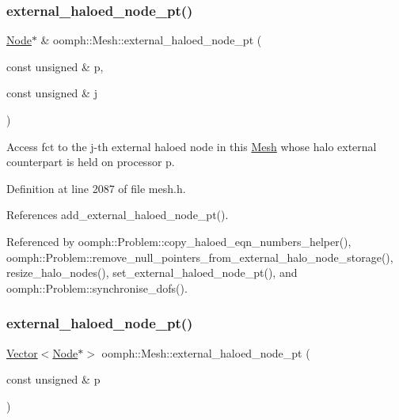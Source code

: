 \subsubsection{\texorpdfstring{external\+\_\+haloed\+\_\+node\+\_\+pt()}{external\_haloed\_node\_pt()}\hspace{0.1cm}{\footnotesize\ttfamily [1/2]}}
{\footnotesize\ttfamily \hyperlink{classoomph_1_1Node}{Node}$\ast$ \& oomph\+::\+Mesh\+::external\+\_\+haloed\+\_\+node\+\_\+pt (\begin{DoxyParamCaption}\item[{const unsigned \&}]{p,  }\item[{const unsigned \&}]{j }\end{DoxyParamCaption})\hspace{0.3cm}{\ttfamily [inline]}}



Access fct to the j-\/th external haloed node in this \hyperlink{classoomph_1_1Mesh}{Mesh} whose halo external counterpart is held on processor p. 



Definition at line 2087 of file mesh.\+h.



References add\+\_\+external\+\_\+haloed\+\_\+node\+\_\+pt().



Referenced by oomph\+::\+Problem\+::copy\+\_\+haloed\+\_\+eqn\+\_\+numbers\+\_\+helper(), oomph\+::\+Problem\+::remove\+\_\+null\+\_\+pointers\+\_\+from\+\_\+external\+\_\+halo\+\_\+node\+\_\+storage(), resize\+\_\+halo\+\_\+nodes(), set\+\_\+external\+\_\+haloed\+\_\+node\+\_\+pt(), and oomph\+::\+Problem\+::synchronise\+\_\+dofs().

\mbox{\label{classoomph_1_1Mesh_ae3675ceb40e2b8e8eaaab4a2c2bddd65}} 
\subsubsection{\texorpdfstring{external\+\_\+haloed\+\_\+node\+\_\+pt()}{external\_haloed\_node\_pt()}\hspace{0.1cm}{\footnotesize\ttfamily [2/2]}}
{\footnotesize\ttfamily \hyperlink{classoomph_1_1Vector}{Vector}$<$\hyperlink{classoomph_1_1Node}{Node}$\ast$$>$ oomph\+::\+Mesh\+::external\+\_\+haloed\+\_\+node\+\_\+pt (\begin{DoxyParamCaption}\item[{const unsigned \&}]{p }\end{DoxyParamCaption})\hspace{0.3cm}{\ttfamily [inline]}}



